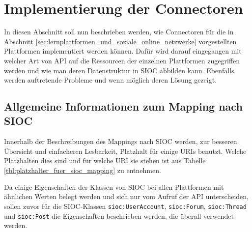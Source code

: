 
\section{Implementierung der Connectoren} %
\label{sec:implementierung_der_connectoren}

In diesen Abschnitt soll nun beschrieben werden, wie Connectoren für die in Abschnitt \ref{sec:lernplattformen_und_soziale_online_netzwerke} vorgestellten Plattformen implementiert werden können. Dafür wird darauf eingegangen mit welcher Art von API auf die Ressourcen der einzelnen Plattformen zugegriffen werden und wie man deren Datenstruktur in SIOC abbilden kann. Ebenfalls werden auftretende Probleme und wenn möglich deren Lösung gezeigt.

\subsection{Allgemeine Informationen zum Mapping nach SIOC} %
\label{sub:allgemeine_informationen_zum_mapping_nach_sioc}

Innerhalb der Beschreibungen des Mappings nach SIOC werden, zur besseren Übersicht und einfacheren Lesbarkeit, Platzhalt für einige URIs benutzt. Welche Platzhalten dies sind und für welche URI sie stehen ist aus Tabelle \ref{tbl:platzhalter_fuer_sioc_mapping} zu entnehmen.

Da einige Eigenschaften der Klassen von SIOC bei allen Plattformen mit ähnlichen Werten belegt werden und sich nur vom Aufruf der API unterscheiden, sollen zuvor für die SIOC-Klassen \texttt{sioc:UserAccount}, \texttt{sioc:Forum}, \texttt{sioc:Thread} und \texttt{sioc:Post} die Eigenschaften beschrieben werden, die überall verwendet werden.

